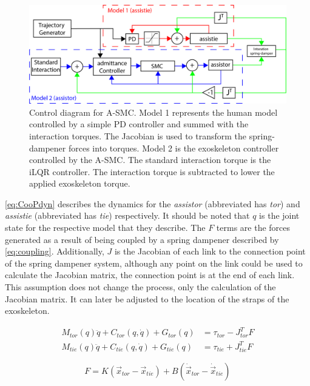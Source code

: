 \begin{figure}
    \centering
    \includegraphics[width=\linewidth]{images/controllers/SMC_control_diagram_overview.png}
    \caption[Control diagram for A-SMC]{Control diagram for A-SMC. Model 1 represents the human model controlled by a simple PD controller and summed with the interaction torques. The Jacobian is used to transform the spring-dampener forces into torques. Model 2 is the exoskeleton controller controlled by the A-SMC. The standard interaction torque is the iLQR controller. The interaction torque is subtracted to lower the applied exoskeleton torque. }
    \label{fig:controlDiagram}
\end{figure}

\autoref{eq:CooPdyn} describes the dynamics for the \textit{assistor} (abbreviated has \textit{tor}) and \textit{assistie} (abbreviated has \textit{tie}) respectively.  It should be noted that $q$ is the joint state for the respective model that they describe. The $F$ terms are the forces generated as a result of being coupled by a spring dampener described by \autoref{eq:coupling}. Additionally, $J$ is the Jacobian of each link to the connection point of the spring dampener system, although any point on the link could be used to calculate the Jacobian matrix, the connection point is at the end of each link. This assumption does not change the process, only the calculation of the Jacobian matrix. It can later be adjusted to the location of the straps of the exoskeleton.

\begin{equation} 
\begin{aligned}
    M_{tor}(q) \ddot{q} + C_{tor} (q,\dot{q}) + G_{tor}(q) &= \tau_{tor} - J_{tor}^T F \\
    M_{tie}(q) \ddot{q} + C_{tie} (q,\dot{q}) + G_{tie}(q) &= \tau_{tie} + J_{tie}^T F
\end{aligned}
    \label{eq:CooPdyn}
\end{equation}

\begin{equation}
    F = K ( \vec{x}_{tor} - \vec{x}_{tie} ) + B (\dot{ \vec{x}}_{tor} - \dot{ \vec{x}}_{tie} ) 
    \label{eq:coupling}
\end{equation}


